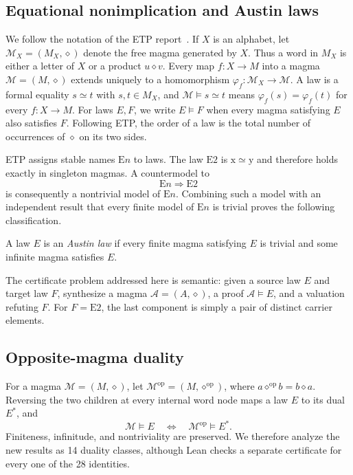 \documentclass[runningheads]{llncs}
\newcommand{\Law}[1]{\ensuremath{\mathrm{E}#1}}
\begin{document}
\subsection{Equational nonimplication and Austin laws}

We follow the notation of the ETP report~\cite{BolanEtAl2025}.  If $X$ is an
alphabet, let $\mathcal M_X=(M_X,\diamond)$ denote the free magma generated by
$X$.  Thus a word in $M_X$ is either a letter of $X$ or a product
$u\diamond v$.  Every map $f:X\to M$ into a magma
$\mathcal M=(M,\diamond)$ extends uniquely to a homomorphism
$\varphi_f:\mathcal M_X\to\mathcal M$.  A law is a formal equality
$s\simeq t$ with $s,t\in M_X$, and
$\mathcal M\models s\simeq t$ means
$\varphi_f(s)=\varphi_f(t)$ for every $f:X\to M$.  For laws $E,F$, we
write $E\models F$ when every magma satisfying $E$ also satisfies $F$.
Following ETP, the order of a law is the total number of occurrences of
$\diamond$ on its two sides.

ETP assigns stable names \Law{n} to laws.  The law \Law{2} is
\(\mathrm{x}\simeq\mathrm{y}\) and therefore holds exactly in singleton
magmas.  A countermodel to
\[
  \Law{n}\Longrightarrow\Law{2}
\]
is consequently a nontrivial model of \Law{n}.  Combining such a model with
an independent result that every finite model of \Law{n} is trivial proves
the following classification.

\begin{definition}
A law $E$ is an \emph{Austin law} if every finite magma satisfying $E$ is
trivial and some infinite magma satisfies $E$.
\end{definition}

The certificate problem addressed here is semantic: given a source law
$E$ and target law $F$, synthesize a magma $\mathcal A=(A,\diamond)$, a proof
$\mathcal A\models E$, and a valuation refuting $F$.  For $F=\Law{2}$,
the last component is simply a pair of distinct carrier elements.

\subsection{Opposite-magma duality}

For a magma $\mathcal M=(M,\diamond)$, let
$\mathcal M^{\mathrm{op}}=(M,\diamond^{\mathrm{op}})$, where
$a\diamond^{\mathrm{op}}b=b\diamond a$.  Reversing the
two children at every internal word node maps a law $E$ to its dual $E^*$,
and
\[
 \mathcal M\models E \quad\Longleftrightarrow\quad
 \mathcal M^{\mathrm{op}}\models E^*.
\]
Finiteness, infinitude, and nontriviality are preserved.  We therefore analyze
the new results as 14 duality classes, although Lean checks a separate
certificate for every one of the 28 identities.
\end{document}
